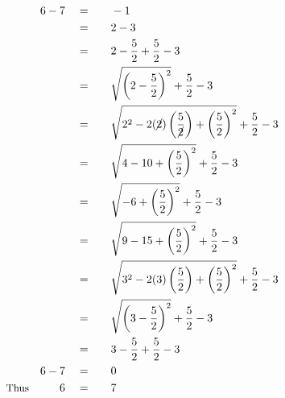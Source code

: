 \begin{alignat*}{5}
&\,&6-7\quad&=\quad&&-1\\
&\,&\,&=&&2-3\\
&\,&\,&=&&2-\frac{5}{2}+\frac{5}{2}-3\\
&\,&\,&=&&\sqrt{\left(2-\frac{5}{2}\right)^2}+\frac{5}{2}-3\\
&\,&\,&=&&\sqrt{2^2-2(\cancel{2})\left(\frac{5}{\cancel{2}}\right)+\left(\frac{5}{2}\right)^2}+\frac{5}{2}-3\\
&\,&\,&=&&\sqrt{4-10+\left(\frac{5}{2}\right)^2}+\frac{5}{2}-3\\
&\,&\,&=&&\sqrt{-6+\left(\frac{5}{2}\right)^2}+\frac{5}{2}-3\\
&\,&\,&=&&\sqrt{9-15+\left(\frac{5}{2}\right)^2}+\frac{5}{2}-3\\
&\,&\,&=&&\sqrt{3^2-2(3)\left(\frac{5}{2}\right)+\left(\frac{5}{2}\right)^2}+\frac{5}{2}-3\\
&\,&\,&=&&\sqrt{\left(3-\frac{5}{2}\right)^2}+\frac{5}{2}-3\\
&\,&\,&=&&3-\frac{5}{2}+\frac{5}{2}-3\\
&\,&6-7\quad&=&&0\\
&\small\text{Thus}&6\quad&=&&7
\end{alignat*}
